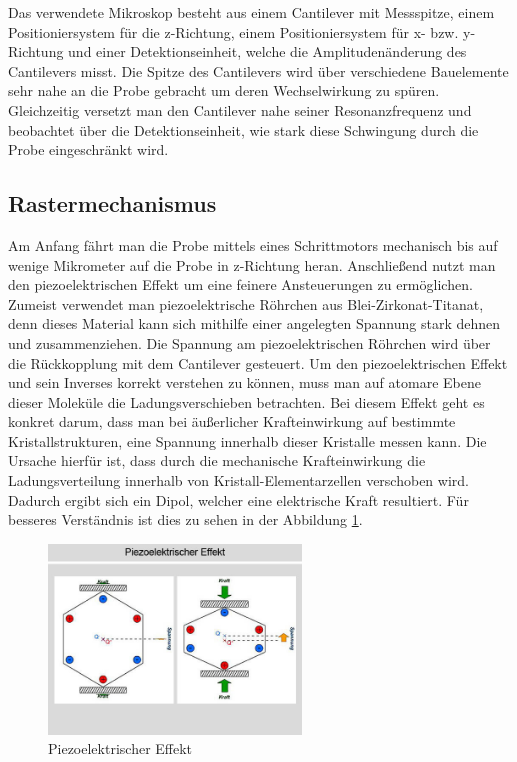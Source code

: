 Das verwendete Mikroskop besteht aus einem Cantilever mit Messspitze, einem Positioniersystem für die z-Richtung, einem Positioniersystem für x- bzw. y-Richtung und einer Detektionseinheit, welche die Amplitudenänderung des Cantilevers misst.  
Die Spitze des Cantilevers wird über verschiedene Bauelemente sehr nahe an die Probe gebracht um deren Wechselwirkung zu spüren.
Gleichzeitig versetzt man den Cantilever nahe seiner Resonanzfrequenz und beobachtet über die Detektionseinheit, wie stark diese Schwingung durch die Probe eingeschränkt wird.


\subsection{Rastermechanismus}

Am Anfang fährt man die Probe mittels eines Schrittmotors mechanisch bis auf wenige Mikrometer auf die Probe in z-Richtung heran.
Anschließend nutzt man den piezoelektrischen Effekt um eine feinere Ansteuerungen zu ermöglichen.
Zumeist verwendet man piezoelektrische Röhrchen aus Blei-Zirkonat-Titanat, denn dieses Material kann sich mithilfe einer angelegten Spannung stark dehnen und zusammenziehen. 
Die Spannung am piezoelektrischen Röhrchen wird über die Rückkopplung mit dem Cantilever gesteuert. 
Um den piezoelektrischen Effekt und sein Inverses korrekt verstehen zu können, muss man auf atomare Ebene dieser Moleküle die Ladungsverschieben betrachten.
Bei diesem Effekt geht es konkret darum, dass man bei äußerlicher Krafteinwirkung auf bestimmte Kristallstrukturen, eine Spannung innerhalb dieser Kristalle messen kann.
Die Ursache hierfür ist, dass durch die mechanische Krafteinwirkung die Ladungsverteilung innerhalb von Kristall-Elementarzellen verschoben wird.
Dadurch ergibt sich ein Dipol, welcher eine elektrische Kraft resultiert.
Für besseres Verständnis ist dies zu sehen in der Abbildung \ref{piezo}.

\begin{figure}[h!]
    \centering
    \includegraphics[width=0.6\textwidth]{Abb/piezo.jpg}
    \caption{Piezoelektrischer Effekt}
    \label{piezo}
\end{figure}

